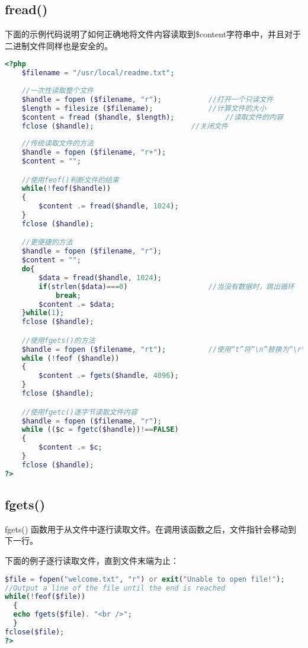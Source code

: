 \subsection{fread()}



下面的示例代码说明了如何正确地将文件内容读取到\$content字符串中，并且对于二进制文件同样也是安全的。


\begin{lstlisting}[language=PHP]
<?php
	$filename = "/usr/local/readme.txt";
	
	//一次性读取整个文件
	$handle = fopen ($filename, "r");			//打开一个只读文件
	$length = filesize ($filename);				//计算文件的大小
	$content = fread ($handle, $length);			//读取文件的内容
	fclose ($handle);						//关闭文件
	
	//传统读取文件的方法
	$handle = fopen ($filename, "r+");
	$content = "";

	//使用feof()判断文件的结束
	while(!feof($handle))
	{
		$content .= fread($handle, 1024);
	}
	fclose ($handle);

	//更便捷的方法
	$handle = fopen ($filename, "r");
	$content = "";
	do{
		$data = fread($handle, 1024);
		if(strlen($data)===0)					//当没有数据时，跳出循环
			break;
		$content .= $data;
	}while(1);
	fclose ($handle);

	//使用fgets()的方法
	$handle = fopen ($filename, "rt");			//使用“t”将“\n”替换为“\r\n”
	while (!feof ($handle)) 
	{
		$content .= fgets($handle, 4096);
	}
	fclose ($handle);

	//使用fgetc()逐字节读取文件内容
	$handle = fopen ($filename, "r");
	while (($c = fgetc($handle))!==FALSE) 
	{
		$content .= $c;
	}
	fclose ($handle);
?>
\end{lstlisting}

\subsection{fgets()}


fgets() 函数用于从文件中逐行读取文件。在调用该函数之后，文件指针会移动到下一行。

下面的例子逐行读取文件，直到文件末端为止：


\begin{lstlisting}[language=PHP]
$file = fopen("welcome.txt", "r") or exit("Unable to open file!");
//Output a line of the file until the end is reached
while(!feof($file))
  {
  echo fgets($file). "<br />";
  }
fclose($file);
?>
\end{lstlisting}


